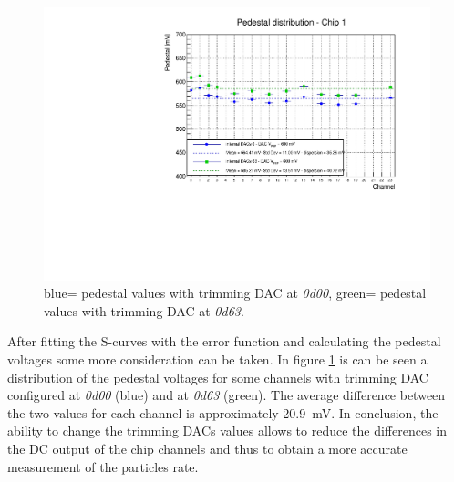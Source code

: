 \begin{figure}[H]
	\centering
	\includegraphics[width=0.8\linewidth]{IMG/ch5/DataDacConfig/DAC_V_REF_600mv-Copia.pdf}
	\caption{{\color{blue}blue}= pedestal values with trimming DAC at \textit{0d00}, {\color{green}green}= pedestal values with trimming DAC at \textit{0d63}.}
	\label{fig:pedestal}
\end{figure}
\noindent After fitting the S-curves with the error function and calculating the pedestal voltages some more consideration can be taken.
In figure \ref{fig:pedestal} is can be seen a distribution of the pedestal voltages for some channels with trimming DAC configured at \textit{0d00} (blue) and at \textit{0d63} (green).
The average difference between the two values for each channel is approximately 20.9~mV.
In conclusion, the ability to change the trimming DACs values allows to reduce the differences in the DC output of the chip channels and thus to obtain a more accurate measurement of the particles rate.

